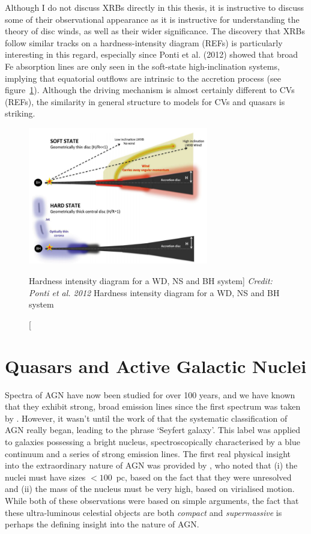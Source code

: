 Although I do not discuss XRBs directly in this thesis, it is instructive
to discuss some of their observational appearance as it is instructive 
for understanding the theory of disc winds, as well as their wider significance. 
The discovery that XRBs follow similar tracks on a hardness-intensity diagram (REFs)
is particularly interesting in this regard, especially since Ponti et al. (2012)
showed that broad Fe absorption lines are only seen in the soft-state 
high-inclination systems, implying that equatorial outflows are intrinsic to 
the accretion process (see figure~\ref{fig:ponti_cartoon}). Although the driving mechanism
is almost certainly different to CVs (REFs), the similarity in general structure 
to models for CVs and quasars is striking.

\begin{figure}
\centering
\includegraphics[width=0.7\textwidth]{figures/01-intro/ponti_wind_cartoon.png}
\caption
[Hardness intensity diagram for a WD, NS and BH system]
{
{\sl Credit: Ponti et al. 2012}
Hardness intensity diagram for a WD, NS and BH system
} 
\label{fig:ponti_cartoon}
\end{figure}


\section{Quasars and Active Galactic Nuclei}

Spectra of AGN have now been studied for over 100 years, and we have known 
that they exhibit strong, broad emission lines since the first spectrum was taken by
\cite{fath1909}.
However, it wasn't until the work of \cite{seyfert1943} that the systematic 
classification of AGN really began, leading to the phrase `Seyfert galaxy'.
This label was applied to galaxies possessing a bright nucleus, spectroscopically
characterised by a blue continuum and a series of strong emission lines.
The first real physical insight into the extraordinary nature of AGN
was provided by \cite{woltjer1959}, who noted that (i) the nuclei must have sizes $<100$~pc,
based on the fact that they were unresolved and (ii) the mass of the nucleus
must be very high, based on virialised motion. 
While both of these observations were based on simple arguments, the fact that these
ultra-luminous celestial objects are both {\em compact} and {\em supermassive}
is perhaps the defining insight into the nature of AGN.

